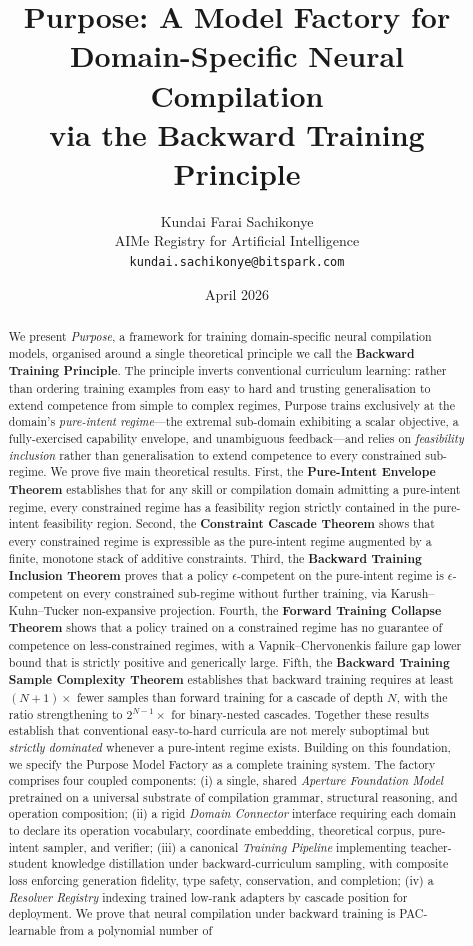 \documentclass[twocolumn,11pt,a4paper]{article}
\title{\textbf{Purpose: A Model Factory for Domain-Specific Neural Compilation\\[4pt] via the Backward Training Principle}}
\author{
Kundai Farai Sachikonye\\
AIMe Registry for Artificial Intelligence\\
\texttt{kundai.sachikonye@bitspark.com}
}
\date{April 2026}
\begin{document}
\maketitle

\begin{abstract}
We present \emph{Purpose}, a framework for training domain-specific neural compilation models, organised around a single theoretical principle we call the \textbf{Backward Training Principle}. The principle inverts conventional curriculum learning: rather than ordering training examples from easy to hard and trusting generalisation to extend competence from simple to complex regimes, Purpose trains exclusively at the domain's \emph{pure-intent regime}---the extremal sub-domain exhibiting a scalar objective, a fully-exercised capability envelope, and unambiguous feedback---and relies on \emph{feasibility inclusion} rather than generalisation to extend competence to every constrained sub-regime. We prove five main theoretical results. First, the \textbf{Pure-Intent Envelope Theorem} establishes that for any skill or compilation domain admitting a pure-intent regime, every constrained regime has a feasibility region strictly contained in the pure-intent feasibility region. Second, the \textbf{Constraint Cascade Theorem} shows that every constrained regime is expressible as the pure-intent regime augmented by a finite, monotone stack of additive constraints. Third, the \textbf{Backward Training Inclusion Theorem} proves that a policy $\epsilon$-competent on the pure-intent regime is $\epsilon$-competent on every constrained sub-regime without further training, via Karush--Kuhn--Tucker non-expansive projection. Fourth, the \textbf{Forward Training Collapse Theorem} shows that a policy trained on a constrained regime has no guarantee of competence on less-constrained regimes, with a Vapnik--Chervonenkis failure gap lower bound that is strictly positive and generically large. Fifth, the \textbf{Backward Training Sample Complexity Theorem} establishes that backward training requires at least $(N+1)\times$ fewer samples than forward training for a cascade of depth $N$, with the ratio strengthening to $2^{N-1}\times$ for binary-nested cascades. Together these results establish that conventional easy-to-hard curricula are not merely suboptimal but \emph{strictly dominated} whenever a pure-intent regime exists. Building on this foundation, we specify the Purpose Model Factory as a complete training system. The factory comprises four coupled components: (i) a single, shared \emph{Aperture Foundation Model} pretrained on a universal substrate of compilation grammar, structural reasoning, and operation composition; (ii) a rigid \emph{Domain Connector} interface requiring each domain to declare its operation vocabulary, coordinate embedding, theoretical corpus, pure-intent sampler, and verifier; (iii) a canonical \emph{Training Pipeline} implementing teacher-student knowledge distillation under backward-curriculum sampling, with composite loss enforcing generation fidelity, type safety, conservation, and completion; (iv) a \emph{Resolver Registry} indexing trained low-rank adapters by cascade position for deployment. We prove that neural compilation under backward training is PAC-learnable from a polynomial number of 
\end{abstract}
\end{document}
